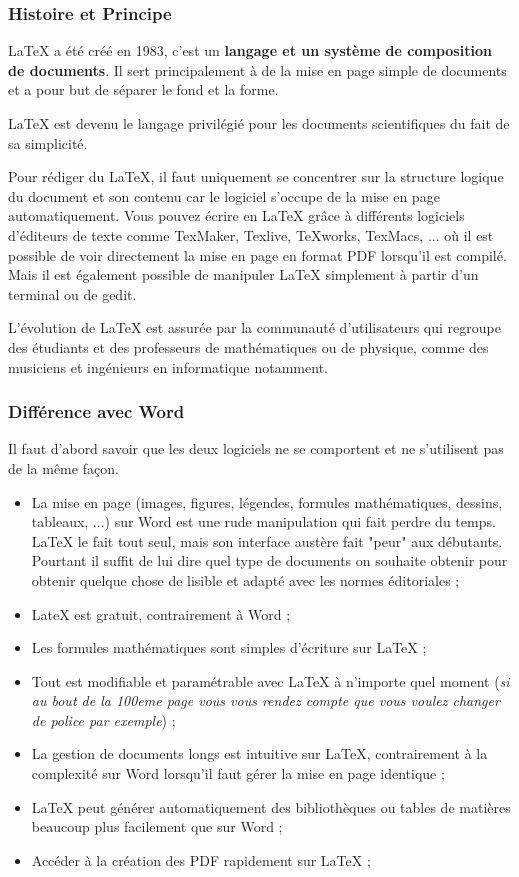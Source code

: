 \subsubsection{Histoire et Principe}

LaTeX a été créé en 1983, c'est un \textbf{langage et un système de composition de documents}.
Il sert principalement à de la mise en page simple de documents et a pour but de séparer le fond et la forme.

LaTeX est devenu le langage privilégié pour les documents scientifiques du fait de sa simplicité.

Pour rédiger du LaTeX, il faut uniquement se concentrer sur la structure logique du document et son contenu car le logiciel
s'occupe de la mise en page automatiquement.
Vous pouvez écrire en LaTeX grâce à différents logiciels d’éditeurs de texte comme TexMaker, Texlive, TeXworks, TexMacs, ...
 où il est possible de voir directement la mise en page en format PDF lorsqu'il est compilé.
Mais il est également possible de manipuler LaTeX simplement à partir d'un terminal ou de gedit.

L'évolution de LaTeX est assurée par la communauté d'utilisateurs qui regroupe des étudiants et des professeurs de mathématiques
ou de physique, comme des musiciens et ingénieurs en informatique notamment.


\subsubsection{Différence avec Word}

Il faut d'abord savoir que les deux logiciels ne se comportent et ne s'utilisent pas de la même façon.

\begin{itemize}
\item La mise en page (images, figures, légendes, formules mathématiques, dessins, tableaux, ...) sur Word est une rude manipulation
 qui fait perdre du temps. LaTeX le fait tout seul, mais son interface austère fait "peur" aux débutants.
  Pourtant il suffit de lui dire quel type de documents on souhaite obtenir pour obtenir quelque chose de lisible
  et adapté avec les normes éditoriales ;
\item LateX est gratuit, contrairement à Word ;
\item Les formules mathématiques sont simples d'écriture sur LaTeX ;
\item Tout est modifiable et paramétrable avec LaTeX à n'importe quel moment
(\textit{si au bout de la 100eme page vous vous rendez compte que vous voulez changer de police par exemple}) ;
\item La gestion de documents longs est intuitive sur LaTeX, contrairement à la complexité sur Word lorsqu'il faut gérer
la mise en page identique ;
\item LaTeX peut générer automatiquement des bibliothèques ou tables de matières beaucoup plus facilement que sur Word ;
\item Accéder à la création des PDF rapidement sur LaTeX ;
\end{itemize}


